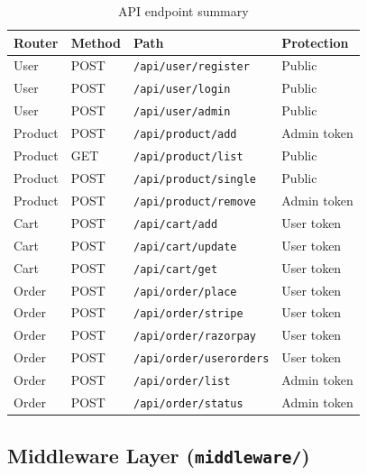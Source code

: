 \documentclass[12pt,a4paper]{report}
\begin{document}
\begin{table}[H]
  \centering
  \caption{API endpoint summary}
  \label{tab:api}
  \begin{tabular}{llll}
    \toprule
    \textbf{Router} & \textbf{Method} & \textbf{Path} & \textbf{Protection} \\
    \midrule
    User    & POST & \texttt{/api/user/register}       & Public       \\
    User    & POST & \texttt{/api/user/login}          & Public       \\
    User    & POST & \texttt{/api/user/admin}          & Public       \\
    \midrule
    Product & POST & \texttt{/api/product/add}         & Admin token  \\
    Product & GET  & \texttt{/api/product/list}        & Public       \\
    Product & POST & \texttt{/api/product/single}      & Public       \\
    Product & POST & \texttt{/api/product/remove}      & Admin token  \\
    \midrule
    Cart    & POST & \texttt{/api/cart/add}            & User token   \\
    Cart    & POST & \texttt{/api/cart/update}         & User token   \\
    Cart    & POST & \texttt{/api/cart/get}            & User token   \\
    \midrule
    Order   & POST & \texttt{/api/order/place}         & User token   \\
    Order   & POST & \texttt{/api/order/stripe}        & User token   \\
    Order   & POST & \texttt{/api/order/razorpay}      & User token   \\
    Order   & POST & \texttt{/api/order/userorders}    & User token   \\
    Order   & POST & \texttt{/api/order/list}          & Admin token  \\
    Order   & POST & \texttt{/api/order/status}        & Admin token  \\
    \bottomrule
  \end{tabular}
\end{table}

\subsection{Middleware Layer (\texttt{middleware/})}
\end{document}
